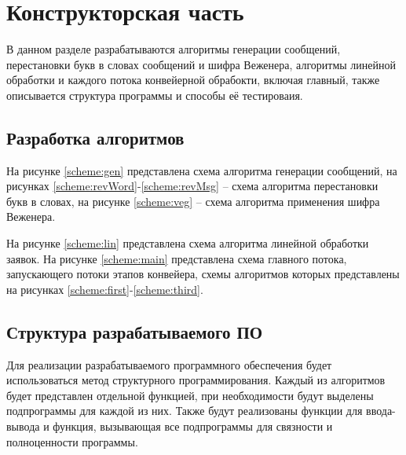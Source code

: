 \chapter{Конструкторская часть}

В данном разделе разрабатываются алгоритмы генерации сообщений, перестановки
букв в словах сообщений и шифра Веженера, алгоритмы линейной обработки и
каждого потока конвейерной обрабокти, включая главный, также описывается
структура программы и способы её тестироваия.

\section{Разработка алгоритмов}

На рисунке \ref{scheme:gen} представлена схема алгоритма генерации сообщений,
на рисунках \ref{scheme:revWord}-\ref{scheme:revMsg} -- схема алгоритма
перестановки букв в словах, на рисунке \ref{scheme:veg} -- схема алгоритма
применения шифра Веженера. 

На рисунке \ref{scheme:lin} представлена схема алгоритма линейной обработки
заявок. На рисунке \ref{scheme:main} представлена схема главного потока,
запускающего потоки этапов конвейера, схемы алгоритмов которых представлены на
рисунках \ref{scheme:first}-\ref{scheme:third}.

\noindent
{}
\noindent
{}
\noindent
{}
\noindent
{}
\noindent
{}
\noindent
{}
\noindent
{}
\noindent
{}
\noindent
{}

\clearpage
\section{Структура разрабатываемого ПО}

Для реализации разрабатываемого программного обеспечения будет использоваться
метод структурного программирования. Каждый из алгоритмов будет представлен
отдельной функцией, при необходимости будут выделены подпрограммы для каждой из
них. Также будут реализованы функции для ввода-вывода и функция, вызывающая все
подпрограммы для связности и полноценности программы.

